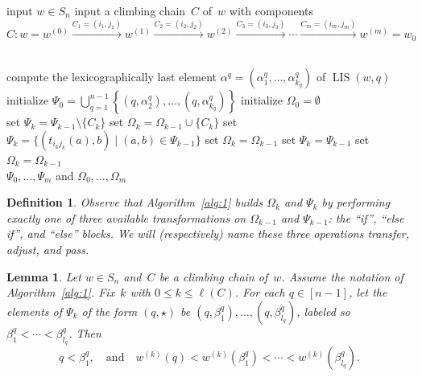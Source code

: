 \documentclass[10pt,a4paper]{amsart}
\DeclareMathOperator{\LIS}{\mathrm{LIS}}
\newtheorem{lemma}[theorem]{Lemma}
\newtheorem{definition}[theorem]{Definition}
\begin{document}
\begin{algorithm}
	\caption{}
	\label{alg:1}
	\begin{algorithmic}
		\State input $w\in S_n$
		\State input a climbing chain~$C$ of~$w$ with components
		\[C: w=w^{(0)} \xrightarrow{C_1=(i_1,j_1)} w^{(1)} \xrightarrow{C_2=(i_2,j_2)} w^{(2)}\xrightarrow{C_3=(i_3,j_3)}\cdots\xrightarrow{C_m=(i_m,j_m)} w^{(m)} = w_0\]
		
		\\
		\State compute the lexicographically last element $\alpha^{q}=(\alpha^q_1,\ldots,\alpha^q_{k_q})$ of $\LIS(w,q)$ 
		\EndFor
		\State initialize $\Psi_0 = \bigcup_{q=1}^{n-1}\left\{(q,\alpha^q_2),\ldots,(q,\alpha^q_{k_q}) \right\}$
		\State initialize $\Omega_0=\emptyset$
		\\
		
		\State set $\Psi_k=\Psi_{k-1}\setminus\{C_k\}$
		\State set $\Omega_k = \Omega_{k-1}\cup\{C_k\}$
		\State set $\Psi_k=\{(t_{i_kj_k}(a), b) \mid (a,b)\in \Psi_{k-1} \}$
		\State set $\Omega_k=\Omega_{k-1}$
		\Else
		\State set $\Psi_k=\Psi_{k-1}$
		\State set $\Omega_k = \Omega_{k-1}$
		\EndIf
		\EndFor\\
		\Return $\Psi_0,\ldots,\Psi_m$ and $\Omega_0,\ldots,\Omega_m$
	\end{algorithmic}
\end{algorithm}


\setcounter{section}{8}\setcounter{theorem}{0}
\begin{definition}
	Observe that Algorithm~\ref{alg:1} builds $\Omega_k$ and $\Psi_k$ by performing exactly one of three available transformations on $\Omega_{k-1}$ and $\Psi_{k-1}$: the ``if'', ``else if'', and ``else'' blocks. We will (respectively) name these three operations \emph{transfer}, \emph{adjust}, and \emph{pass}.
\end{definition}

\setcounter{section}{8}\setcounter{theorem}{2}
\begin{lemma}
	\label{lem:algkeyproperty}
	Let $w\in S_n$ and~$C$ be a climbing chain of~$w$. Assume the notation of Algorithm~\ref{alg:1}. Fix~$k$ with $0\leq k\leq \ell(C)$. For each $q\in [n-1]$, let the elements of $\Psi_k$ of the form $(q,\star)$ be $(q,\beta^q_1),\ldots,(q,\beta^q_{l_q})$, labeled so $\beta^q_1<\cdots<\beta^q_{l_q}$. Then
	\[q<\beta^q_1, \quad\mbox{and}\quad w^{(k)}(q) < w^{(k)}(\beta^q_1) < \cdots < w^{(k)}(\beta^q_{l_q}).\]
\end{lemma}
\end{document}
